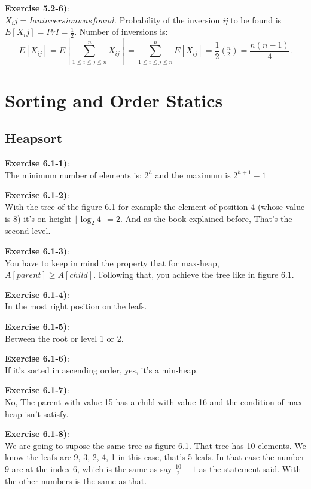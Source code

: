 \documentclass{article}
\newcounter{exercise}[section]   %
\begin{document}
\textbf{Exercise 5.2-6)}:\\
\(X_ij = I{an inversion was found}\). Probability of the inversion \textit{ij} to be found
is \(E[X_ij] = Pr{I} = \frac{1}{2}\). Number of inversions is:
\[
E[X_{ij}] = E \left[\sum_{1 \leq i \leq j \leq n}^{n} X_{ij}\right] = \sum_{1 \leq i \leq j
\leq n}^{n} E[X_{ij}] = \frac{1}{2} (^n_2) = \frac{n(n - 1)}{4}.
\]

\section{Sorting and Order Statics}

\subsection{Heapsort}
\setcounter{exercise}{0}

\textbf{Exercise 6.1-1)}:\\
The minimum number of elements is: \(2^h\) and the maximum is \(2^{h + 1} - 1\)

\textbf{Exercise 6.1-2)}:\\
With the tree of the figure 6.1 for example the element of position 4 (whose value is 8)
it's on height \(\lfloor \log_2 4 \rfloor = 2\). And as the book explained before, That's
the second level.

\textbf{Exercise 6.1-3)}:\\
You have to keep in mind the property that for max-heap, \(A[parent] \geq A[child]\). Following
that, you achieve the tree like in figure 6.1.

\textbf{Exercise 6.1-4)}:\\
In the most right position on the leafs.

\textbf{Exercise 6.1-5)}:\\
Between the root or level 1 or 2.

\textbf{Exercise 6.1-6)}:\\
If it's sorted in ascending order, yes, it's a min-heap.

\textbf{Exercise 6.1-7)}:\\
No, The parent with value 15 has a child with value 16 and the condition of max-heap isn't 
satisfy.

\textbf{Exercise 6.1-8)}:\\
We are going to supose the same tree as figure 6.1. That tree has 10 elements. We know the
leafs are 9, 3, 2, 4, 1  in this case, that's 5 leafs. In that case the number 9 are at the 
index 6, which is the same as say \(\frac{10}{2} + 1\) as the statement said. With the other
numbers is the same as that. 
\end{document}
